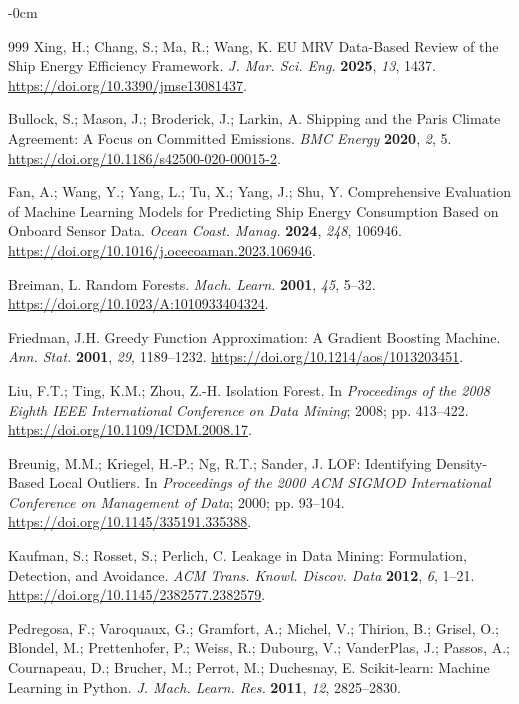 \documentclass[jmse,article,submit,pdftex,oneauthor]{Definitions/mdpi}
\begin{document}
\begin{adjustwidth}{-\extralength}{0cm}
\begin{thebibliography}{999}
Xing, H.; Chang, S.; Ma, R.; Wang, K. EU MRV Data-Based Review of the Ship Energy Efficiency Framework. \textit{J. Mar. Sci. Eng.} \textbf{2025}, \textit{13}, 1437. \url{https://doi.org/10.3390/jmse13081437}.

Bullock, S.; Mason, J.; Broderick, J.; Larkin, A. Shipping and the Paris Climate Agreement: A Focus on Committed Emissions. \textit{BMC Energy} \textbf{2020}, \textit{2}, 5. \url{https://doi.org/10.1186/s42500-020-00015-2}.

Fan, A.; Wang, Y.; Yang, L.; Tu, X.; Yang, J.; Shu, Y. Comprehensive Evaluation of Machine Learning Models for Predicting Ship Energy Consumption Based on Onboard Sensor Data. \textit{Ocean Coast. Manag.} \textbf{2024}, \textit{248}, 106946. \url{https://doi.org/10.1016/j.ocecoaman.2023.106946}.

Breiman, L. Random Forests. \textit{Mach. Learn.} \textbf{2001}, \textit{45}, 5--32. \url{https://doi.org/10.1023/A:1010933404324}.

Friedman, J.H. Greedy Function Approximation: A Gradient Boosting Machine. \textit{Ann. Stat.} \textbf{2001}, \textit{29}, 1189--1232. \url{https://doi.org/10.1214/aos/1013203451}.

Liu, F.T.; Ting, K.M.; Zhou, Z.-H. Isolation Forest. In \textit{Proceedings of the 2008 Eighth IEEE International Conference on Data Mining}; 2008; pp. 413--422. \url{https://doi.org/10.1109/ICDM.2008.17}.

Breunig, M.M.; Kriegel, H.-P.; Ng, R.T.; Sander, J. LOF: Identifying Density-Based Local Outliers. In \textit{Proceedings of the 2000 ACM SIGMOD International Conference on Management of Data}; 2000; pp. 93--104. \url{https://doi.org/10.1145/335191.335388}.

Kaufman, S.; Rosset, S.; Perlich, C. Leakage in Data Mining: Formulation, Detection, and Avoidance. \textit{ACM Trans. Knowl. Discov. Data} \textbf{2012}, \textit{6}, 1--21. \url{https://doi.org/10.1145/2382577.2382579}.

Pedregosa, F.; Varoquaux, G.; Gramfort, A.; Michel, V.; Thirion, B.; Grisel, O.; Blondel, M.; Prettenhofer, P.; Weiss, R.; Dubourg, V.; VanderPlas, J.; Passos, A.; Cournapeau, D.; Brucher, M.; Perrot, M.; Duchesnay, E. Scikit-learn: Machine Learning in Python. \textit{J. Mach. Learn. Res.} \textbf{2011}, \textit{12}, 2825--2830.

\end{thebibliography}

\PublishersNote{}
\end{adjustwidth}
\end{document}
